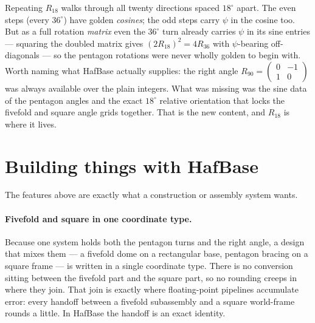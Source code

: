 \documentclass[11pt]{article}
\begin{document}
Repeating $R_{18}$ walks through all twenty directions spaced $18^\circ$ apart. The even steps (every
$36^\circ$) have golden \emph{cosines}; the odd steps carry $\psi$ in the cosine too. But as a full
rotation \emph{matrix} even the $36^\circ$ turn already carries $\psi$ in its sine entries --- squaring
the doubled matrix gives $(2R_{18})^2 = 4R_{36}$ with $\psi$-bearing off-diagonals --- so the pentagon
rotations were never wholly golden to begin with. Worth naming what HafBase actually supplies: the right
angle $R_{90} = \left(\begin{smallmatrix}0&-1\\1&0\end{smallmatrix}\right)$ was always available over the
plain integers. What was missing was the sine data of the pentagon angles and the exact $18^\circ$
relative orientation that locks the fivefold and square angle grids together. That is the new content,
and $R_{18}$ is where it lives.

\section{Building things with HafBase}

The features above are exactly what a construction or assembly system wants.

\paragraph{Fivefold and square in one coordinate type.} Because one system holds both the pentagon
turns and the right angle, a design that mixes them --- a fivefold dome on a rectangular base,
pentagon bracing on a square frame --- is written in a single coordinate type. There is no conversion
sitting between the fivefold part and the square part, so no rounding creeps in where they join. That
join is exactly where floating-point pipelines accumulate error: every handoff between a fivefold
subassembly and a square world-frame rounds a little. In HafBase the handoff is an exact identity.
\end{document}
